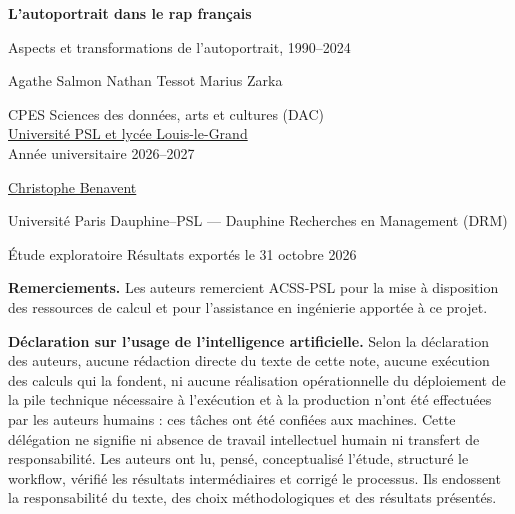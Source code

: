 \documentclass[a4paper,11pt]{article}
\begin{document}
\thispagestyle{empty}
\begin{center}
{\LARGE\bfseries L'autoportrait dans le rap français\par}
\vspace{3pt}
{\large Aspects et transformations de l'autoportrait, 1990--2024\par}
\vspace{9pt}
{\large Agathe Salmon \quad Nathan Tessot \quad Marius Zarka\par}
\vspace{5pt}
{\small CPES Sciences des données, arts et cultures (DAC)\\
\href{https://psl.eu/formation/cpes-psl-louis-le-grand}{Université PSL et lycée Louis-le-Grand}\\
Année universitaire 2026--2027\par}
\vspace{5pt}
{\large \href{https://www.linkedin.com/in/christophebenavent/}{Christophe Benavent}\par}
{\small Université Paris Dauphine--PSL --- Dauphine Recherches en Management (DRM)\par}
\vspace{5pt}
{\small Étude exploratoire \textperiodcentered{} Résultats exportés le 31 octobre 2026}
\end{center}

{\small\textbf{Remerciements.} Les auteurs remercient ACSS-PSL pour la mise
à disposition des ressources de calcul et pour l'assistance en ingénierie
apportée à ce projet.\par}

{\small\textbf{Déclaration sur l'usage de l'intelligence artificielle.}
Selon la déclaration des auteurs, aucune rédaction directe du texte de cette
note, aucune exécution des calculs qui la fondent, ni aucune réalisation
opérationnelle du déploiement de la pile technique nécessaire à l'exécution
et à la production n'ont été effectuées par les auteurs humains : ces tâches
ont été confiées aux machines. Cette délégation ne signifie ni absence de
travail intellectuel humain ni transfert de responsabilité. Les auteurs ont
lu, pensé, conceptualisé l'étude, structuré le workflow, vérifié les résultats
intermédiaires et corrigé le processus. Ils endossent la responsabilité
du texte, des choix méthodologiques et des résultats présentés.\par}
\end{document}
